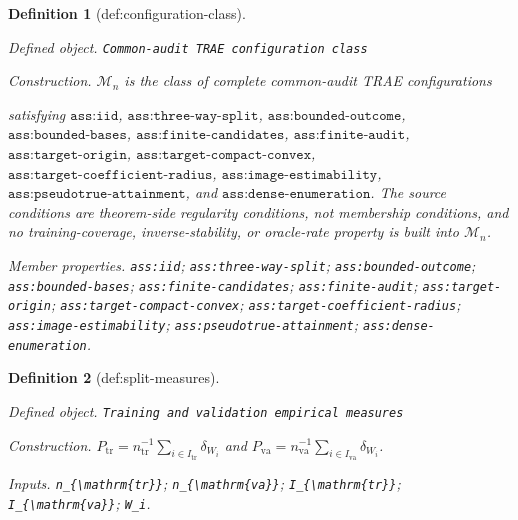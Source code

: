 \documentclass{article}
\newtheorem{definition}{Definition}
\begin{document}
\begin{definition}[def:configuration-class]\label{def:configuration-class}
\par\smallskip\noindent\emph{Defined object.} \texttt{Common-\allowbreak{}audit TRAE configuration class}
\par\smallskip\noindent\emph{Construction.} \(\mathcal M_n\) is the class of complete common-audit TRAE configurations \par\noindent {}\par\noindent satisfying \(\texttt{ass:iid}\), \(\texttt{ass:three-way-split}\), \(\texttt{ass:bounded-outcome}\), \(\texttt{ass:bounded-bases}\), \(\texttt{ass:finite-candidates}\), \(\texttt{ass:finite-audit}\), \(\texttt{ass:target-origin}\), \(\texttt{ass:target-compact-convex}\), \(\texttt{ass:target-coefficient-radius}\), \(\texttt{ass:image-estimability}\), \(\texttt{ass:pseudotrue-attainment}\), and \(\texttt{ass:dense-enumeration}\). The source conditions are theorem-side regularity conditions, not membership conditions, and no training-coverage, inverse-stability, or oracle-rate property is built into \(\mathcal M_n\).
\par\smallskip\noindent\emph{Member properties.} \texttt{ass:\allowbreak{}iid}; \texttt{ass:\allowbreak{}three-\allowbreak{}way-\allowbreak{}split}; \texttt{ass:\allowbreak{}bounded-\allowbreak{}outcome}; \texttt{ass:\allowbreak{}bounded-\allowbreak{}bases}; \texttt{ass:\allowbreak{}finite-\allowbreak{}candidates}; \texttt{ass:\allowbreak{}finite-\allowbreak{}audit}; \texttt{ass:\allowbreak{}target-\allowbreak{}origin}; \texttt{ass:\allowbreak{}target-\allowbreak{}compact-\allowbreak{}convex}; \texttt{ass:\allowbreak{}target-\allowbreak{}coefficient-\allowbreak{}radius}; \texttt{ass:\allowbreak{}image-\allowbreak{}estimability}; \texttt{ass:\allowbreak{}pseudotrue-\allowbreak{}attainment}; \texttt{ass:\allowbreak{}dense-\allowbreak{}enumeration}.
\end{definition}

\begin{definition}[def:split-measures]\label{def:split-measures}
\par\smallskip\noindent\emph{Defined object.} \texttt{Training and validation empirical measures}
\par\smallskip\noindent\emph{Construction.} \(P_{\mathrm{tr}}=n_{\mathrm{tr}}^{-1}\sum_{i\in I_{\mathrm{tr}}}\delta_{W_i}\) and \(P_{\mathrm{va}}=n_{\mathrm{va}}^{-1}\sum_{i\in I_{\mathrm{va}}}\delta_{W_i}\).
\par\smallskip\noindent\emph{Inputs.} \texttt{n\_\allowbreak{}\{\textbackslash{}\allowbreak{}mathrm\{tr\}\allowbreak{}\}\allowbreak{}}; \texttt{n\_\allowbreak{}\{\textbackslash{}\allowbreak{}mathrm\{va\}\allowbreak{}\}\allowbreak{}}; \texttt{I\_\allowbreak{}\{\textbackslash{}\allowbreak{}mathrm\{tr\}\allowbreak{}\}\allowbreak{}}; \texttt{I\_\allowbreak{}\{\textbackslash{}\allowbreak{}mathrm\{va\}\allowbreak{}\}\allowbreak{}}; \texttt{W\_\allowbreak{}i}.
\end{definition}
\end{document}
